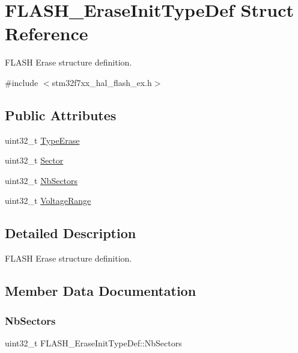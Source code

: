 \hypertarget{struct_f_l_a_s_h___erase_init_type_def}{}\section{F\+L\+A\+S\+H\+\_\+\+Erase\+Init\+Type\+Def Struct Reference}
\label{struct_f_l_a_s_h___erase_init_type_def}


F\+L\+A\+SH Erase structure definition.  




{\ttfamily \#include $<$stm32f7xx\+\_\+hal\+\_\+flash\+\_\+ex.\+h$>$}

\subsection*{Public Attributes}
\begin{DoxyCompactItemize}
\item 
uint32\+\_\+t \mbox{\hyperlink{struct_f_l_a_s_h___erase_init_type_def_a5d08471046a663db76d2252848a7d66c}{Type\+Erase}}
\item 
uint32\+\_\+t \mbox{\hyperlink{struct_f_l_a_s_h___erase_init_type_def_a13bac8f9a1ba504a265b44345ecf4d2b}{Sector}}
\item 
uint32\+\_\+t \mbox{\hyperlink{struct_f_l_a_s_h___erase_init_type_def_aec98fec1676cd618e3743158c855a76a}{Nb\+Sectors}}
\item 
uint32\+\_\+t \mbox{\hyperlink{struct_f_l_a_s_h___erase_init_type_def_a3a2a0c2c4ed573bb84c768c6dbb92cc9}{Voltage\+Range}}
\end{DoxyCompactItemize}


\subsection{Detailed Description}
F\+L\+A\+SH Erase structure definition. 

\subsection{Member Data Documentation}
\mbox{\label{struct_f_l_a_s_h___erase_init_type_def_aec98fec1676cd618e3743158c855a76a}} 
\subsubsection{\texorpdfstring{NbSectors}{NbSectors}}
{\footnotesize\ttfamily uint32\+\_\+t F\+L\+A\+S\+H\+\_\+\+Erase\+Init\+Type\+Def\+::\+Nb\+Sectors}

